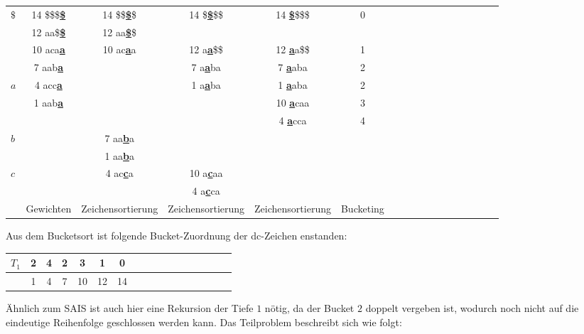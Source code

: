 \begin{center}
  \begin{tabular}{ | l | c | c | c | c | c | c | c | c | c | c | c | c | c | c | c | c | }
    \hline
       $\$$ & 14 \$\$\$\textbf{\underline{\$}} & 14 \$\$\textbf{\underline{\$}}\$ & 14 \$\textbf{\underline{\$}}\$\$ & 14 \textbf{\underline{\$}}\$\$\$ & 0 \\
            & 12 aa\$\textbf{\underline{\$}} & 12 aa\textbf{\underline{\$}}\$ & & & \\ \hline
            & 10 aca\textbf{\underline{a}} & 10 ac\textbf{\underline{a}}a & 12 a\textbf{\underline{a}}\$\$ & 12 \textbf{\underline{a}}a\$\$ & 1 \\
            & 7 aab\textbf{\underline{a}} & & 7 a\textbf{\underline{a}}ba & 7 \textbf{\underline{a}}aba & 2 \\
        $a$ & 4 acc\textbf{\underline{a}} & & 1 a\textbf{\underline{a}}ba & 1 \textbf{\underline{a}}aba & 2  \\
            & 1 aab\textbf{\underline{a}} & & & 10 \textbf{\underline{a}}caa & 3 \\
            & & & & 4 \textbf{\underline{a}}cca & 4  \\ \hline
        $b$ & & 7 aa\textbf{\underline{b}}a & & & \\
            & & 1 aa\textbf{\underline{b}}a & & & \\ \hline
        $c$ & & 4 ac\textbf{\underline{c}}a & 10 a\textbf{\underline{c}}aa & & \\
            & & & 4 a\textbf{\underline{c}}ca & & \\ \hline
            & Gewichten & Zeichensortierung & Zeichensortierung & Zeichensortierung & Bucketing \\
    \hline
  \end{tabular}
\end{center}
\bigskip
\newpage
\noindent Aus dem Bucketsort ist folgende Bucket-Zuordnung der dc-Zeichen enstanden:

\begin{center}
  \begin{tabular}{ | l | c | c | c | c | c | c | c | c | c | c | c | c | c | c | c | c | }
    \hline
        $T_1$ & 2 & 4 & 2 & 3 & 1 & 0 \\ \hline
              & 1 & 4 & 7 & 10 & 12 & 14  \\
    \hline
  \end{tabular}
\end{center}
\bigskip
Ähnlich zum SAIS ist auch hier eine Rekursion der Tiefe $1$ nötig, da der Bucket $2$ doppelt vergeben ist, wodurch noch nicht auf die eindeutige Reihenfolge geschlossen werden kann. Das Teilproblem beschreibt sich wie folgt:

